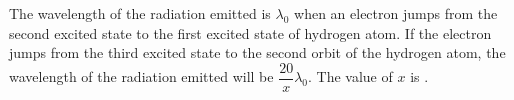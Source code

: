 \item The wavelength of the radiation emitted is $\lambda_0$ when an electron jumps from the second excited state to the first excited state of hydrogen atom. If the electron jumps from the third excited state to the second orbit of the hydrogen atom, the wavelength of the radiation emitted will be $\dfrac{20}{x} \lambda_0$. The value of $x$ is \underline{\hspace{2.5cm}}.